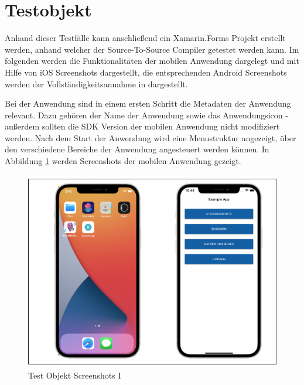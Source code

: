 \section{Testobjekt}
Anhand dieser Testfälle kann anschließend ein Xamarin.Forms Projekt erstellt werden, anhand welcher der Source-To-Source Compiler getestet werden kann.  Im folgenden werden die Funktionalitäten der mobilen Anwendung dargelegt und mit Hilfe von iOS Screenshots dargestellt,  die entsprechenden Android Screenshots werden der Vollständigkeitsannahme in  dargestellt. 

Bei der Anwendung sind in einem ersten Schritt die Metadaten der Anwendung relevant.  Dazu gehören der Name der Anwendung sowie das Anwendungsicon - außerdem sollten die SDK Version der mobilen Anwendung nicht modifiziert werden. Nach dem Start der Anwendung wird eine Menustruktur angezeigt,  über den verschiedene Bereiche der Anwendung angesteuert werden können.  In Abbildung \ref{fig:TestObjectI} werden Screenshots der mobilen Anwendung gezeigt.

\begin{figure}[!ht]
 \includegraphics[width=\textwidth,keepaspectratio]{Images/Screenshot/AppIconAndMenu.png}
 \caption{Test Objekt Screenshots I}
 \label{fig:TestObjectI}
\end{figure}

